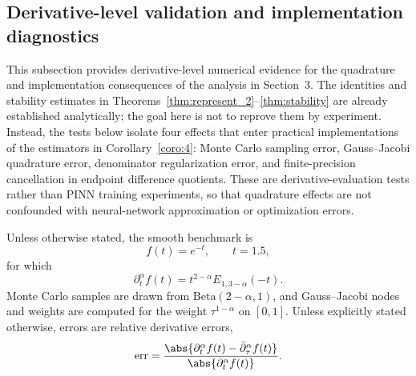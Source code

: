 
\subsection{Derivative-level validation and implementation diagnostics}
\label{subsec:num-valid}

This subsection provides derivative-level numerical evidence for the quadrature and implementation consequences of the analysis in Section~3.  The identities and stability estimates in Theorems~\ref{thm:represent_2}--\ref{thm:stability} are already established analytically; the goal here is not to reprove them by experiment.  Instead, the tests below isolate four effects that enter practical implementations of the estimators in Corollary~\ref{coro:4}: Monte Carlo sampling error, Gauss--Jacobi quadrature error, denominator regularization error, and finite-precision cancellation in endpoint difference quotients.  These are derivative-evaluation tests rather than PINN training experiments, so that quadrature effects are not confounded with neural-network approximation or optimization errors.

Unless otherwise stated, the smooth benchmark is
\begin{equation}
    f(t)=e^{-t},\qquad t=1.5,
    \label{eq:valid-exp-benchmark}
\end{equation}
for which
\begin{equation}
    \partial_t^\alpha f(t)=t^{2-\alpha}E_{1,3-\alpha}(-t).
\end{equation}
Monte Carlo samples are drawn from $\mathrm{Beta}(2-\alpha,1)$, and Gauss--Jacobi nodes and weights are computed for the weight $\tau^{1-\alpha}$ on $[0,1]$.  Unless explicitly stated otherwise, errors are relative derivative errors,
\begin{equation}
    \mathrm{err}=\frac{\abs{\partial_t^\alpha f(t)-\bar\partial_\tau^\alpha f(t)}}{\abs{\partial_t^\alpha f(t)}}.
\end{equation}

